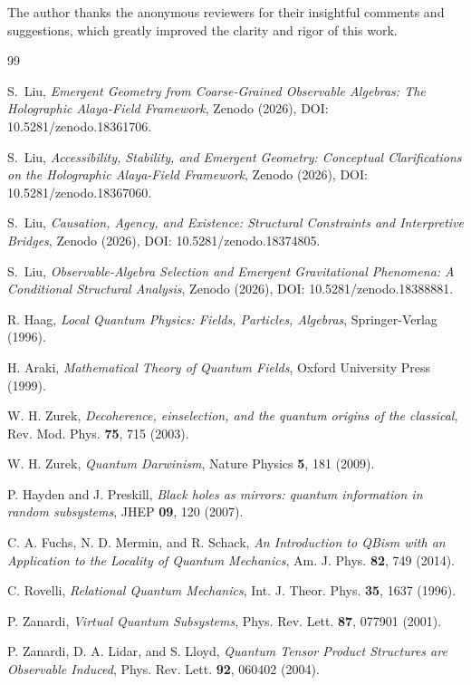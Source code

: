 \documentclass[12pt,a4paper]{article}
\begin{document}
The author thanks the anonymous reviewers for their insightful comments and suggestions, which greatly improved the clarity and rigor of this work.

\begin{thebibliography}{99}

S.~Liu, \emph{Emergent Geometry from Coarse-Grained Observable Algebras: The Holographic Alaya-Field Framework}, Zenodo (2026), DOI: 10.5281/zenodo.18361706.

S.~Liu, \emph{Accessibility, Stability, and Emergent Geometry: Conceptual Clarifications on the Holographic Alaya-Field Framework}, Zenodo (2026), DOI: 10.5281/zenodo.18367060.

S.~Liu, \emph{Causation, Agency, and Existence: Structural Constraints and Interpretive Bridges}, Zenodo (2026), DOI: 10.5281/zenodo.18374805.

S.~Liu, \emph{Observable-Algebra Selection and Emergent Gravitational Phenomena: A Conditional Structural Analysis}, Zenodo (2026), DOI: 10.5281/zenodo.18388881.

R. Haag, \emph{Local Quantum Physics: Fields, Particles, Algebras}, Springer-Verlag (1996).

H. Araki, \emph{Mathematical Theory of Quantum Fields}, Oxford University Press (1999).

W. H. Zurek, \emph{Decoherence, einselection, and the quantum origins of the classical}, Rev. Mod. Phys. \textbf{75}, 715 (2003).

W. H. Zurek, \emph{Quantum Darwinism}, Nature Physics \textbf{5}, 181 (2009).

P. Hayden and J. Preskill, \emph{Black holes as mirrors: quantum information in random subsystems}, JHEP \textbf{09}, 120 (2007).

C. A. Fuchs, N. D. Mermin, and R. Schack, \emph{An Introduction to QBism with an Application to the Locality of Quantum Mechanics}, Am. J. Phys. \textbf{82}, 749 (2014).

C. Rovelli, \emph{Relational Quantum Mechanics}, Int. J. Theor. Phys. \textbf{35}, 1637 (1996).

P. Zanardi, \emph{Virtual Quantum Subsystems}, Phys. Rev. Lett. \textbf{87}, 077901 (2001).

P. Zanardi, D. A. Lidar, and S. Lloyd, \emph{Quantum Tensor Product Structures are Observable Induced}, Phys. Rev. Lett. \textbf{92}, 060402 (2004).

\end{thebibliography}
\end{document}

